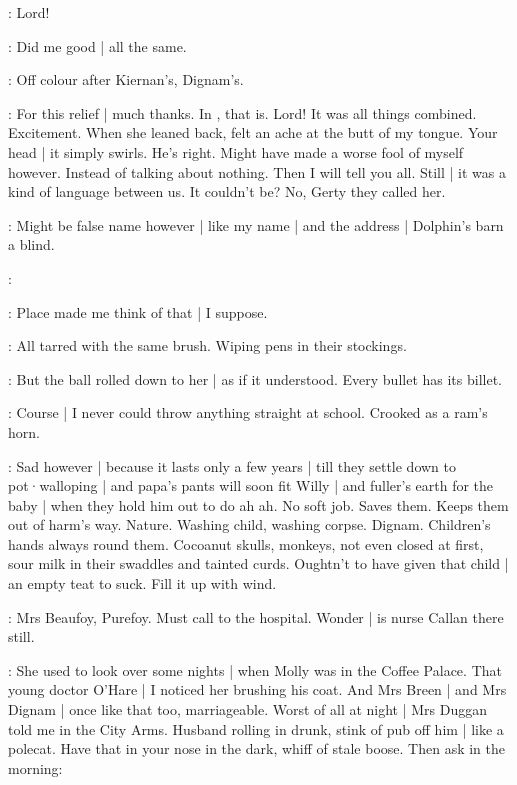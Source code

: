\BloomInt:
Lord!

\BloomCurrent:
Did me good |
all the same.

\BloomToday:
Off colour after Kiernan's,
Dignam's.

\BloomCurrent:
For this relief |
much thanks.
In ,
that is.%
Lord!
It was all things combined.
Excitement.
When she leaned back,
felt an ache at the butt of my tongue.
Your head |
it simply swirls.
He's right.
Might have made a worse fool of myself however.
Instead of talking about nothing.
Then I will tell you all.
Still |
it was a kind of language between us.
It couldn't be?
No,
Gerty they called her.

\BloomToday:
Might be false name however |
like my name |
and the address |
Dolphin's barn a blind.

\BloomInt:

\BloomCurrent:
Place made me think of that |
I suppose.

\BloomAbstract:
All tarred with the same brush.
Wiping pens in their stockings.%

\BloomCurrent:
But the ball rolled down to her |
as if it understood.
Every bullet has its billet.

\BloomHist:
Course |
I never could throw anything straight at school.
Crooked as a ram's horn.

\BloomAbstract:
Sad however |
because it lasts only a few years |
till they settle down to pot·walloping |
and papa's pants will soon fit Willy |
and fuller's earth for the baby |
when they hold him out to do ah ah.
No soft job.
Saves them.
Keeps them out of harm's way.
Nature.
Washing child,
washing corpse.
Dignam.
Children's hands always round them.
Cocoanut skulls,
monkeys,
not even closed at first,
sour milk in their swaddles and tainted curds.
Oughtn't to have given that child |
an empty teat to suck.
Fill it up with wind.

\BloomToday:
Mrs Beaufoy,
Purefoy.
Must call to the hospital.
Wonder |
is nurse Callan there still.%

\BloomHist:
She used to look over some nights |
when Molly was in the Coffee Palace.
That young doctor O'Hare |
I noticed her brushing his coat.
And Mrs Breen |
and Mrs Dignam |
once like that too,
marriageable.
Worst of all at night |
Mrs Duggan told me in the City Arms.
Husband rolling in drunk,
stink of pub off him |
like a polecat.
Have that in your nose in the dark,
whiff of stale boose.
Then ask in the morning:


